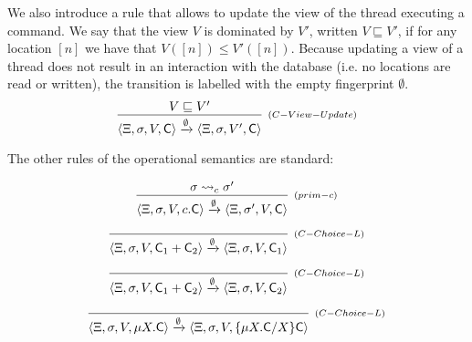 \documentclass[a4paper,UKenglish]{article}%
\theoremstyle{plain}
\begin{document}
We also introduce a rule that allows to update the view of the thread executing a command. 
We say that the view $V$ is dominated by $V'$, written $V \sqsubseteq V'$, if for any 
location $[n]$ we have that $V([n]) \leq V'([n])$. Because updating a view of a thread 
does not result in an interaction with the database (i.e. no locations are read or written), 
the transition is labelled with the empty fingerprint $\emptyset$.
\[
\infer[{\scriptstyle{(C-View-Update)}}]
{\langle \hh, \thdstack, V, \cmd \rangle \xrightarrow{\emptyset} \langle \hh, \thdstack, V', \cmd \rangle }
{ V \sqsubseteq V'}
\]

The other rules of the operational semantics are standard: 

\[
\infer[{\scriptstyle{(prim-c)}}]
{\langle \hh, \thdstack, V, \primc.\cmd \rangle \xrightarrow{\emptyset} \langle \hh, \thdstack', V, \cmd \rangle}
{\thdstack \rightsquigarrow_c \thdstack'} 
\]

\[
\infer[{\scriptstyle{(C-Choice-L)}}]
{\langle \hh, \thdstack, V, \cmd_1 + \cmd_2 \rangle \xrightarrow{\emptyset} \langle \hh, \thdstack, V, \cmd_1 \rangle}
{} 
\]

\[
\infer[{\scriptstyle{(C-Choice-L)}}]
{\langle \hh, \thdstack, V, \cmd_1 + \cmd_2 \rangle \xrightarrow{\emptyset} \langle \hh, \thdstack, V, \cmd_2 \rangle}
{} 
\]

\[
\infer[{\scriptstyle{(C-Choice-L)}}]
{\langle \hh, \thdstack, V, \mu X.\cmd \rangle \xrightarrow{\emptyset} \langle \hh, \thdstack, V, \{\mu X.\cmd/X\}\cmd \rangle}
{} 
\]

%
%
%

\end{document}
